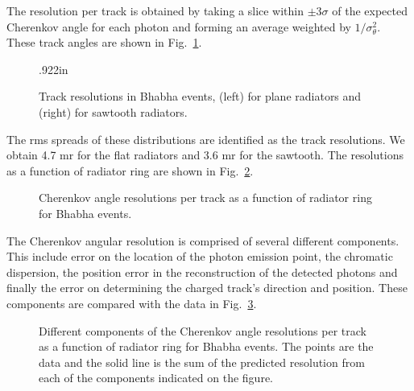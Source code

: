 \documentclass[fleqn,twoside]{article}
\begin{document}
The resolution per track is obtained by taking a slice within $\pm 3\sigma$
of the expected Cherenkov angle for each photon and forming an
average weighted by $1/\sigma^2_{\theta}$.
These track angles are shown in Fig.~\ref{trk_res}.
\begin{figure} [htb]
\vspace{1cm} \centerline{\hspace{1in}\epsfxsize .922in
} \vspace{-0.4cm}
\centerline{\epsfxsize 2.65in}
\vspace{-.7cm} \caption{\label{trk_res} Track resolutions in
Bhabha events,
   (left) for plane radiators and (right) for sawtooth radiators.}
\vspace{-0.7cm}\end{figure}

The rms spreads of these distributions are identified as the track
resolutions. We obtain 4.7 mr for the flat radiators and 3.6 mr
for the sawtooth. The resolutions as a function of radiator ring
are shown in Fig.~\ref{bha_track}.
\begin{figure} [htb]
\centerline{\hspace{.5in}\epsfxsize 1.3in
} \vspace{-.4cm}
\caption{\label{bha_track} Cherenkov angle resolutions per track
as a function of radiator ring for Bhabha events.}
\vspace{-0.7cm}\end{figure}

The Cherenkov angular resolution is comprised of several different
components. This include error on the location of the photon emission point,
the chromatic dispersion, the position error in the reconstruction of the
detected photons and finally the error on determining the charged track's direction and position.
These components are compared with the data in Fig.~\ref{res}.

\begin{figure} [htb]
\centerline{\hspace{.4in}\epsfxsize 2.1in
} \vspace{-.4cm}
\caption{\label{res} Different components of the Cherenkov angle
resolutions per track as a function of radiator ring for Bhabha
events. The points are the data and the solid line is the sum of
the predicted resolution from each of the components indicated on
the figure.} \vspace{-0.7cm}\end{figure}
\end{document}
